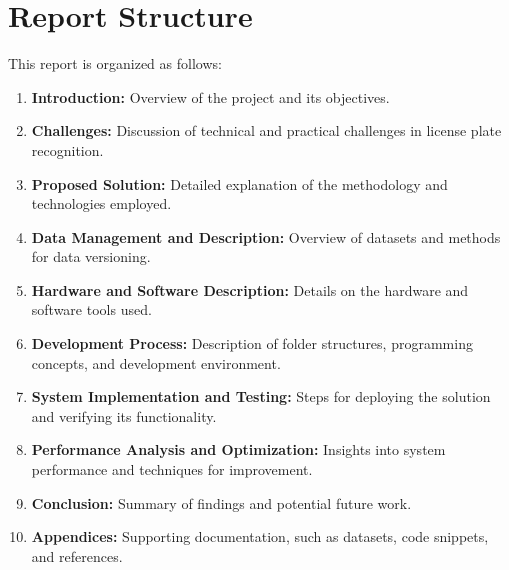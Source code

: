 \section{Report Structure}

This report is organized as follows:

\begin{enumerate}
	\item \textbf{Introduction:} Overview of the project and its objectives.
	\item \textbf{Challenges:} Discussion of technical and practical challenges in license plate recognition.
	\item \textbf{Proposed Solution:} Detailed explanation of the methodology and technologies employed.
	\item \textbf{Data Management and Description:} Overview of datasets and methods for data versioning.
	\item \textbf{Hardware and Software Description:} Details on the hardware and software tools used.
	\item \textbf{Development Process:} Description of folder structures, programming concepts, and development environment.
	\item \textbf{System Implementation and Testing:} Steps for deploying the solution and verifying its functionality.
	\item \textbf{Performance Analysis and Optimization:} Insights into system performance and techniques for improvement.
	\item \textbf{Conclusion:} Summary of findings and potential future work.
	\item \textbf{Appendices:} Supporting documentation, such as datasets, code snippets, and references.
\end{enumerate}

